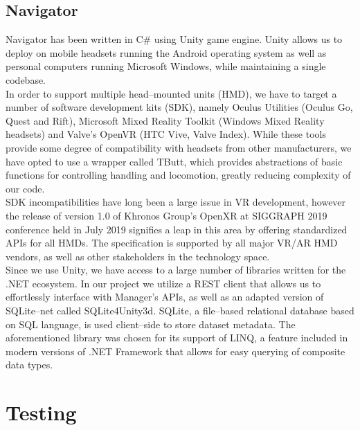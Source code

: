 \documentclass{article}
\begin{document}
\subsection{Navigator}

Navigator has been written in C\# using Unity game engine.\cite{unity} Unity allows us to deploy on mobile headsets running the Android operating system as well as personal computers running Microsoft Windows, while maintaining a single codebase.\\

In order to support multiple head--mounted units (HMD), we have to target a number of software development kits (SDK), namely Oculus Utilities (Oculus Go, Quest and Rift)\cite{oculusunity}, Microsoft Mixed Reality Toolkit (Windows Mixed Reality headsets)\cite{mrtk} and Valve's OpenVR (HTC Vive, Valve Index).\cite{openvr} While these tools provide some degree of compatibility with headsets from other manufacturers, we have opted to use a wrapper called TButt, which provides abstractions of basic functions for controlling handling and locomotion, greatly reducing complexity of our code.\cite{tbutt}\\

SDK incompatibilities have long been a large issue in VR development, however the release of version 1.0 of Khronos Group's OpenXR at SIGGRAPH 2019 conference held in July 2019 signifies a leap in this area by offering standardized APIs for all HMDs. The specification is supported by all major VR/AR HMD vendors, as well as other stakeholders in the technology space.\cite{openxr}\\

Since we use Unity, we have access to a large number of libraries written for the .NET ecosystem. In our project we utilize a REST client\cite{restclient} that allows us to effortlessly interface with Manager's APIs, as well as an adapted version of SQLite--net called SQLite4Unity3d.\cite{sqliteunity} SQLite, a file--based relational database based on SQL language, is used client--side to store dataset metadata.\cite{sqlite} The aforementioned library was chosen for its support of LINQ, a feature included in modern versions of .NET Framework that allows for easy querying of composite data types.\cite{linq}

\newpage

\section{Testing}
\end{document}
